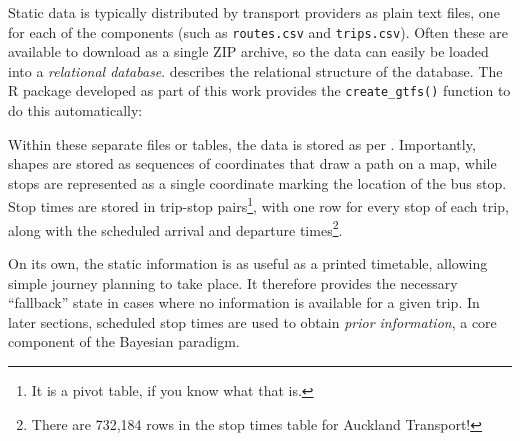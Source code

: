 \begin{knitrout}\small
{}\color{fgcolor}\begin{kframe}


{\ttfamily\noindent\itshape\color{messagecolor}{\#\# Loading required namespace: transitr}}\end{kframe}
\end{knitrout}

Static \GTFS{} data is typically distributed by transport providers as plain text files, one for each of the components (such as \verb+routes.csv+ and \verb+trips.csv+). Often these are available to download as a single ZIP archive, so the data can easily be loaded into a \emph{relational database}.  describes the relational structure of the \GTFS{} database. The R package developed as part of this work provides the \verb+create_gtfs()+ function to do this automatically:
\begin{knitrout}\small
{}\color{fgcolor}\begin{kframe}
\begin{alltt}
 \hlkwb{<-} \hlstd{(}\hlstd{,}  \hlstd{=} \hlstd{)}
\end{alltt}
\end{kframe}
\end{knitrout}




Within these separate files or tables, the data is stored as per \GTFS{}. Importantly, shapes are stored as sequences of coordinates that draw a path on a map, while stops are represented as a single coordinate marking the location of the bus stop. Stop times are stored in trip-stop pairs\footnote{It is a pivot table, if you know what that is.}, with one row for every stop of each trip, along with the scheduled arrival and departure times\footnote{There are 732,184 rows in the stop times table for Auckland Transport!}.



On its own, the static \GTFS{} information is as useful as a printed timetable, allowing simple journey planning to take place. It therefore provides the necessary ``fallback'' state in cases where no \rt{} information is available for a given trip. In later sections, scheduled stop times are used to obtain \emph{prior information}, a core component of the Bayesian paradigm.



